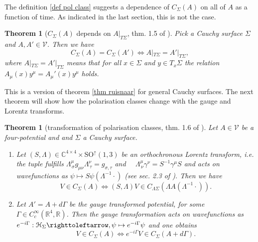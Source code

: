 \documentclass[b5paper,draft,openbib,12pt]{memoir}
\newtheorem{Thm}[Def]{Theorem}
\begin{document}
The definition \eqref{def pol class} suggests a dependence of 
\(C_{\Sigma}(A)\) on all of \(A\) as a function of time. 
As indicated in the last section,
this is not the case.

\begin{Thm}[\(C_{\Sigma}(A)\) depends on \(A|_{T\Sigma}\), thm. 1.5 of \cite{ivp2}]\label{thm: pol class history}
Pick a Cauchy surface \(\Sigma\) and \(A,A'\in \mathcal{V}\). 
Then we have 
\begin{equation}
  C_{\Sigma}(A)=C_{\Sigma}(A') \iff A|_{T\Sigma}=A'|_{T\Sigma},
\end{equation}
where \(A|_{T\Sigma}=A'|_{T\Sigma}\) means that for all \(x\in \Sigma\)
and \(y\in T_x\Sigma\) the relation 
\(A_\mu(x) y^\mu=A_\mu'(x) y^\mu\) holds. 
\end{Thm}

This is a version of theorem \ref{thm ruisnaar} for general 
Cauchy surfaces.
The next theorem will show how the polarisation classes change 
with the gauge and Lorentz transforms.

\begin{Thm}[transformation of polarisation classes, thm. 1.6 of \cite{ivp2}]\label{thm: pol class transform}
Let \(A\in\mathcal{V}\) be a four-potential and and \(\Sigma\) 
a Cauchy surface.

\begin{enumerate}[label=\alph*)]
\item Let \((S,\Lambda)\in \mathbb{C}^{4\times 4}\times \mathrm{SO}^{\uparrow}(1,3)\)
be an orthochronous Lorentz transform, i.e. the tuple fulfills
\(\Lambda^{\mu}_{\, \sigma}g_{\mu \nu}\Lambda^\nu_{\, \tau}=g_{\sigma, \tau}\) 
and \(\quad \Lambda^\mu_{\, \nu}\gamma^\nu = S^{-1} \gamma^\mu S\) 
and acts on wavefunctions as \(\psi\mapsto S\psi(\Lambda^{-1}\cdot)\) (see sec. 2.3 of \cite{ivp1}). 
Then we have
\begin{equation}
V\in C_{\Sigma}(A) \iff (S,\Lambda)V \in C_{\Lambda \Sigma}(\Lambda A (\Lambda^{-1}\cdot)).
\end{equation}
\item Let \(A'=A+d\Gamma\) be the gauge transformed potential, 
for some \(\Gamma \in C_c^\infty(\mathbb{R}^4,\mathbb{R})\). Then
the gauge transformation acts on wavefunctions as 
\(e^{-i\Gamma}:\mathcal{H}_{\Sigma}\righttoleftarrow,\psi\mapsto e^{-i\Gamma}\psi\)
and one obtains 
\begin{equation}
V\in C_{\Sigma}(A) \iff e^{-i\Gamma}V \in C_{\Sigma}(A+d\Gamma).
\end{equation}
\end{enumerate}
\end{Thm}
\end{document}
